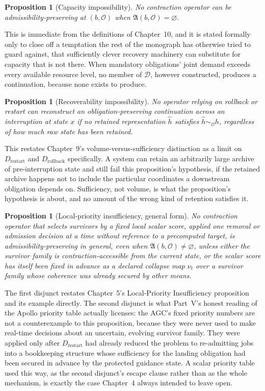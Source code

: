 \documentclass[11pt]{report}
\newtheorem{proposition}[definition]{Proposition}
\begin{document}
\begin{proposition}[Capacity impossibility]
No contraction operator can be admissibility-preserving at $(b, \mathcal O)$ when $\mathfrak A(b, \mathcal O) = \varnothing$.
\end{proposition}

This is immediate from the definitions of Chapter~10, and it is stated formally only to close off a temptation the rest of the monograph has otherwise tried to guard against, that sufficiently clever recovery machinery can substitute for capacity that is not there. When mandatory obligations' joint demand exceeds every available resource level, no member of $\mathcal D$, however constructed, produces a continuation, because none exists to produce.

\begin{proposition}[Recoverability impossibility]
No operator relying on rollback or restart can reconstruct an obligation-preserving continuation across an interruption at state $x$ if no retained representation $\widehat h$ satisfies $\widehat h \sim_{\mathcal O} h$, regardless of how much raw state has been retained.
\end{proposition}

This restates Chapter~9's volume-versus-sufficiency distinction as a limit on $D_{\mathrm{restart}}$ and $D_{\mathrm{rollback}}$ specifically. A system can retain an arbitrarily large archive of pre-interruption state and still fail this proposition's hypothesis, if the retained archive happens not to include the particular coordinates a downstream obligation depends on. Sufficiency, not volume, is what the proposition's hypothesis is about, and no amount of the wrong kind of retention satisfies it.

\begin{proposition}[Local-priority insufficiency, general form]
No contraction operator that selects survivors by a fixed local scalar score, applied one removal or admission decision at a time without reference to a precomputed target, is admissibility-preserving in general, even when $\mathfrak A(b, \mathcal O) \ne \varnothing$, unless either the survivor family is contraction-accessible from the current state, or the scalar score has itself been fixed in advance as a declared collapse map $\nu_t$ over a survivor family whose coherence was already secured by other means.
\end{proposition}

The first disjunct restates Chapter~5's Local-Priority Insufficiency proposition and its example directly. The second disjunct is what Part~V's honest reading of the Apollo priority table actually licenses: the AGC's fixed priority numbers are not a counterexample to this proposition, because they were never used to make real-time decisions about an uncertain, evolving survivor family. They were applied only after $D_{\mathrm{restart}}$ had already reduced the problem to re-admitting jobs into a bookkeeping structure whose sufficiency for the landing obligation had been secured in advance by the protected guidance state. A scalar priority table used this way, as the second disjunct's escape clause rather than as the whole mechanism, is exactly the case Chapter~4 always intended to leave open.
\end{document}
